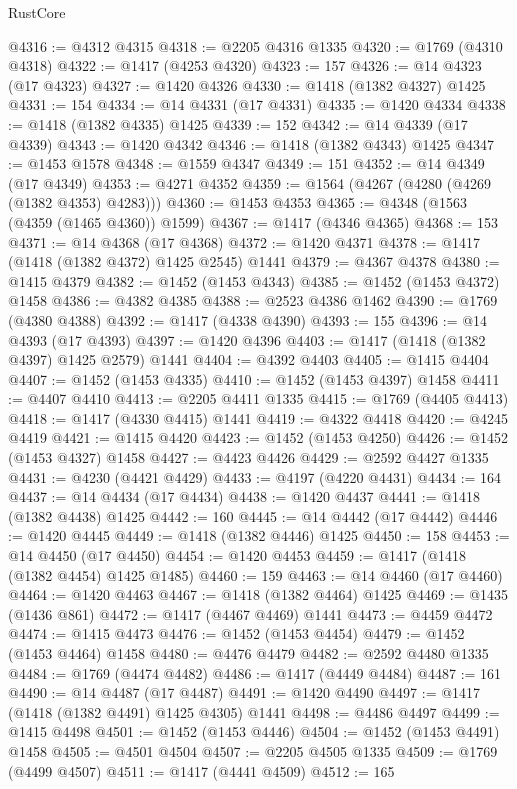 \begin{lexlean}{RustCore}
\begin{coremodule}
@4316 := @4312 @4315
@4318 := @2205 @4316 @1335
@4320 := @1769 (@4310 @4318)
@4322 := @1417 (@4253 @4320)
@4323 := 157
@4326 := @14 @4323 (@17 @4323)
@4327 := @1420 @4326
@4330 := @1418 (@1382 @4327) @1425
@4331 := 154
@4334 := @14 @4331 (@17 @4331)
@4335 := @1420 @4334
@4338 := @1418 (@1382 @4335) @1425
@4339 := 152
@4342 := @14 @4339 (@17 @4339)
@4343 := @1420 @4342
@4346 := @1418 (@1382 @4343) @1425
@4347 := @1453 @1578
@4348 := @1559 @4347
@4349 := 151
@4352 := @14 @4349 (@17 @4349)
@4353 := @4271 @4352
@4359 := @1564 (@4267 (@4280 (@4269 (@1382 @4353) @4283)))
@4360 := @1453 @4353
@4365 := @4348 (@1563 (@4359 (@1465 @4360)) @1599)
@4367 := @1417 (@4346 @4365)
@4368 := 153
@4371 := @14 @4368 (@17 @4368)
@4372 := @1420 @4371
@4378 := @1417 (@1418 (@1382 @4372) @1425 @2545) @1441
@4379 := @4367 @4378
@4380 := @1415 @4379
@4382 := @1452 (@1453 @4343)
@4385 := @1452 (@1453 @4372) @1458
@4386 := @4382 @4385
@4388 := @2523 @4386 @1462
@4390 := @1769 (@4380 @4388)
@4392 := @1417 (@4338 @4390)
@4393 := 155
@4396 := @14 @4393 (@17 @4393)
@4397 := @1420 @4396
@4403 := @1417 (@1418 (@1382 @4397) @1425 @2579) @1441
@4404 := @4392 @4403
@4405 := @1415 @4404
@4407 := @1452 (@1453 @4335)
@4410 := @1452 (@1453 @4397) @1458
@4411 := @4407 @4410
@4413 := @2205 @4411 @1335
@4415 := @1769 (@4405 @4413)
@4418 := @1417 (@4330 @4415) @1441
@4419 := @4322 @4418
@4420 := @4245 @4419
@4421 := @1415 @4420
@4423 := @1452 (@1453 @4250)
@4426 := @1452 (@1453 @4327) @1458
@4427 := @4423 @4426
@4429 := @2592 @4427 @1335
@4431 := @4230 (@4421 @4429)
@4433 := @4197 (@4220 @4431)
@4434 := 164
@4437 := @14 @4434 (@17 @4434)
@4438 := @1420 @4437
@4441 := @1418 (@1382 @4438) @1425
@4442 := 160
@4445 := @14 @4442 (@17 @4442)
@4446 := @1420 @4445
@4449 := @1418 (@1382 @4446) @1425
@4450 := 158
@4453 := @14 @4450 (@17 @4450)
@4454 := @1420 @4453
@4459 := @1417 (@1418 (@1382 @4454) @1425 @1485)
@4460 := 159
@4463 := @14 @4460 (@17 @4460)
@4464 := @1420 @4463
@4467 := @1418 (@1382 @4464) @1425
@4469 := @1435 (@1436 @861)
@4472 := @1417 (@4467 @4469) @1441
@4473 := @4459 @4472
@4474 := @1415 @4473
@4476 := @1452 (@1453 @4454)
@4479 := @1452 (@1453 @4464) @1458
@4480 := @4476 @4479
@4482 := @2592 @4480 @1335
@4484 := @1769 (@4474 @4482)
@4486 := @1417 (@4449 @4484)
@4487 := 161
@4490 := @14 @4487 (@17 @4487)
@4491 := @1420 @4490
@4497 := @1417 (@1418 (@1382 @4491) @1425 @4305) @1441
@4498 := @4486 @4497
@4499 := @1415 @4498
@4501 := @1452 (@1453 @4446)
@4504 := @1452 (@1453 @4491) @1458
@4505 := @4501 @4504
@4507 := @2205 @4505 @1335
@4509 := @1769 (@4499 @4507)
@4511 := @1417 (@4441 @4509)
@4512 := 165

\end{coremodule}
\end{lexlean}

